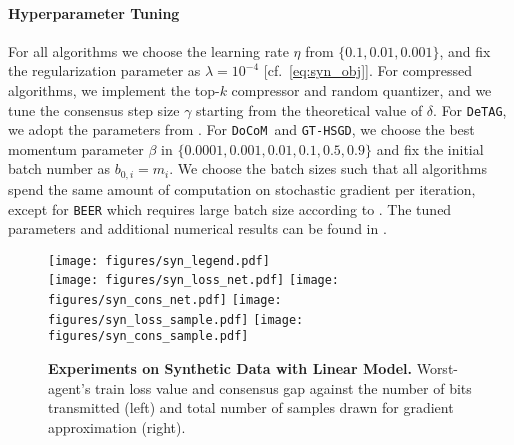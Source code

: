 \documentclass[10pt]{article} %
\theoremstyle{plain}
\theoremstyle{definition}
\theoremstyle{remark}
\newcommand{\aname}{{\tt DoCoM}}
\begin{document}
\paragraph{Hyperparameter Tuning} 
For all algorithms we choose the learning rate $\eta$ from $\{0.1, 0.01, 0.001\}$, and fix the regularization parameter as $\lambda = 10^{-4}$ [cf.~\eqref{eq:syn_obj}]. For compressed algorithms, we implement the top-$k$ compressor and random quantizer, and we tune the consensus step size $\gamma$ starting from the theoretical value of $\delta$.
For {\tt DeTAG}, we adopt the parameters from \citep{pmlr-v139-lu21a}. For \aname~and {\tt GT-HSGD}, we choose the best momentum parameter $\beta$ in $\{0.0001, 0.001, 0.01, 0.1, 0.5, 0.9\}$ and fix the initial batch number as $b_{0,i} = m_i$. We choose the batch sizes such that all algorithms spend the same amount of computation on stochastic gradient per iteration, except for {\tt BEER} which requires large batch size according to \citep{zhao2022beer}. The tuned parameters and additional numerical results can be found in . 

\begin{figure*}[hbtp]
    \centering \vspace{-0.15cm}
    \texttt{[image: figures/syn\_legend.pdf]}\\
    \texttt{[image: figures/syn\_loss\_net.pdf]}
    \texttt{[image: figures/syn\_cons\_net.pdf]}
    \texttt{[image: figures/syn\_loss\_sample.pdf]}
    \texttt{[image: figures/syn\_cons\_sample.pdf]}\\
    \caption{\textbf{Experiments on Synthetic Data with Linear Model.} Worst-agent's train loss value and consensus gap against the number of bits transmitted (left) and total number of samples drawn for gradient approximation (right).
    }\label{fig:syn}
\end{figure*}
\end{document}
